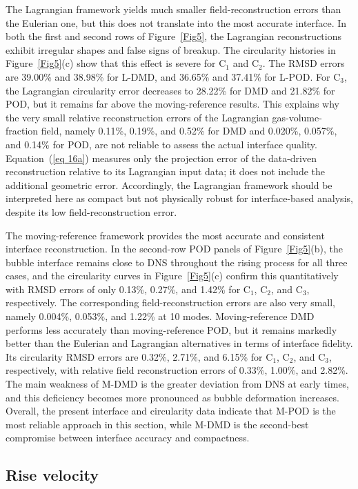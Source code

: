 \documentclass[a4paper,fleqn]{cas-sc}
\begin{document}
	The Lagrangian framework yields much smaller field-reconstruction errors than the Eulerian one, but this does not translate into the most accurate interface. In both the first and second rows of Figure~\ref{Fig5}, the Lagrangian reconstructions exhibit irregular shapes and false signs of breakup. The circularity histories in Figure~\ref{Fig5}(c) show that this effect is severe for C$_1$ and C$_2$. The RMSD errors are 39.00\% and 38.98\% for L-DMD, and 36.65\% and 37.41\% for L-POD. For C$_3$, the Lagrangian circularity error decreases to 28.22\% for DMD and 21.82\% for POD, but it remains far above the moving-reference results. This explains why the very small relative reconstruction errors of the Lagrangian gas-volume-fraction field, namely 0.11\%, 0.19\%, and 0.52\% for DMD and 0.020\%, 0.057\%, and 0.14\% for POD, are not reliable to assess the actual interface quality. Equation~(\ref{eq 16a}) measures only the projection error of the data-driven reconstruction relative to its Lagrangian input data; it does not include the additional geometric error. Accordingly, the Lagrangian framework should be interpreted here as compact but not physically robust for interface-based analysis, despite its low field-reconstruction error.
	
	The moving-reference framework provides the most accurate and consistent interface reconstruction. In the second-row POD panels of Figure~\ref{Fig5}(b), the bubble interface remains close to DNS throughout the rising process for all three cases, and the circularity curves in Figure~\ref{Fig5}(c) confirm this quantitatively with RMSD errors of only 0.13\%, 0.27\%, and 1.42\% for C$_1$, C$_2$, and C$_3$, respectively. The corresponding field-reconstruction errors are also very small, namely 0.004\%, 0.053\%, and 1.22\% at 10 modes. Moving-reference DMD performs less accurately than moving-reference POD, but it remains markedly better than the Eulerian and Lagrangian alternatives in terms of interface fidelity. Its circularity RMSD errors are 0.32\%, 2.71\%, and 6.15\% for C$_1$, C$_2$, and C$_3$, respectively, with relative field reconstruction errors of 0.33\%, 1.00\%, and 2.82\%. The main weakness of M-DMD is the greater deviation from DNS at early times, and this deficiency becomes more pronounced as bubble deformation increases. Overall, the present interface and circularity data indicate that M-POD is the most reliable approach in this section, while M-DMD is the second-best compromise between interface accuracy and compactness.
	
	\subsection{Rise velocity}
	\label{Rise velocity}
	
\end{document}
